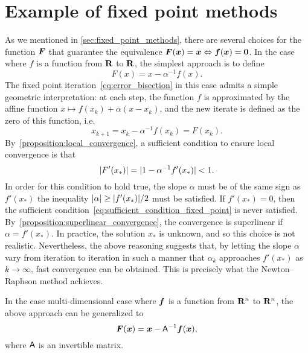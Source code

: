 \section{Example of fixed point methods}
As we mentioned in \cref{sec:fixed_point_methods},
there are several choices for the function $\mathbf{\boldsymbol{F}}$ that guarantee
the equivalence $\mathbf{\boldsymbol{F}}(\mathbf{\boldsymbol{x}}) = \mathbf{\boldsymbol{x}} \Leftrightarrow \mathbf{\boldsymbol{f}}(\mathbf{\boldsymbol{x}}) = \mathbf{\boldsymbol{0}}$.
In the case where $f$ is a function from $\mathbf R$ to $\mathbf R$,
the simplest approach is to define
\[
    F(x) = x - \alpha^{-1} f(x).
\]
The fixed point iteration~\eqref{eq:error_bisection} in this case admits a simple geometric interpretation:
at each step, the function $f$ is approximated by the affine function $x \mapsto f(x_k) + \alpha (x - x_k)$,
and the new iterate is defined as the zero of this function,
i.e.
\[
    x_{k+1} = x_k - \alpha^{-1} f(x_k) = F(x_k).
\]
By~\cref{proposition:local_convergence},
a sufficient condition to ensure local convergence is that
\begin{equation}
    \label{eq:sufficient_condition_fixed_point}
    \lvert F'(x_*)\rvert = \lvert1 - \alpha^{-1} f'(x_*)\rvert < 1.
\end{equation}
In order for this condition to hold true,
the slope $\alpha$ must be of the same sign as $f'(x_*)$
the inequality $\lvert\alpha\rvert \geq \lvert f'(x_*)\rvert/2$ must be satisfied.
If $f'(x_*) = 0$,
then the sufficient condition~\eqref{eq:sufficient_condition_fixed_point} is never satisfied.
By~\cref{proposition:superlinear_convergence},
the convergence is superlinear if~$\alpha = f'(x_*)$.
In practice, the solution $x_*$ is unknown,
and so this choice is not realistic.
Nevertheless, the above reasoning suggests that, by letting the slope $\alpha$ vary from iteration to iteration in such a manner that $\alpha_k$ approaches $f'(x_*)$ as $k \to \infty$,
fast convergence can be obtained.
This is precisely what the Newton--Raphson method achieves.

In the case multi-dimensional case where $\mathbf{\boldsymbol{f}}$ is a function from $\mathbf R^n$ to $\mathbf R^n$,
the above approach can be generalized to
\[
    \mathbf{\boldsymbol{F}}(\mathbf{\boldsymbol{x}}) = \mathbf{\boldsymbol{x}} - \mathsf A^{-1} \mathbf{\boldsymbol{f}}(\mathbf{\boldsymbol{x}}),
\]
where $\mathsf A$ is an invertible matrix.

\begin{center}
\end{center}

